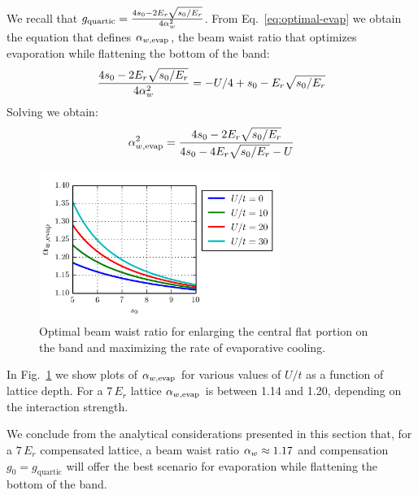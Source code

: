We recall that  $g_{\text{quartic}} = \frac{  4 s_{0} - 2
E_{r}\sqrt{s_{0}/E_{r}} }{ 4  \alpha_{w} ^{2} } $. From Eq.~\ref{eq:optimal-evap} we
obtain the equation that defines $ \alpha_{w,\text{evap}} $,  the beam waist ratio that
optimizes evaporation while flattening the bottom of the band: 
\begin{equation}  
   \frac{  4 s_{0} - 2 E_{r}\sqrt{s_{0}/E_{r}} }{ 4  \alpha_{w} ^{2} }  
   =  -U/4  + s_{0} -  E_{r}\sqrt{s_{0}/E_{r}}
\end{equation} 
Solving we obtain:
\begin{equation}
  \alpha_{w,\text{evap}} ^{2} =  \frac{ 4 s_{0} - 2 E_{r} \sqrt{s_{0}/E_{r} }}
    { 4s_{0} - 4 E_{r} \sqrt{s_{0}/E_{r}}  - U } 
 \label{eq:awaistevap}  
\end{equation} 
\begin{figure}
    \centering
\includegraphics[width=0.7\textwidth]{../figures/lda_evap/alpha-evap-optimal.png}
\caption{\small Optimal beam waist ratio for enlarging the central flat portion on
the band and maximizing the rate of evaporative cooling. }
\label{fig:alpha-evap-optimal}
\end{figure}
In Fig.~\ref{fig:alpha-evap-optimal} we show plots of $ \alpha_{w,\text{evap}} $ for various
values of $U/t$ as a function of lattice depth.  For a 7\,$E_{r}$ lattice
$ \alpha_{w,\text{evap}} $ is between 1.14 and 1.20, depending on the interaction strength.  

We conclude from the analytical considerations presented in this section that, for a
$7\,E_{r}$ compensated lattice,  a  beam waist ratio $ \alpha_{w}  \approx 1.17$ and
compensation $g_{0}=g_{\text{quartic}}$ will offer the best scenario for
evaporation while flattening the bottom of the band.  




